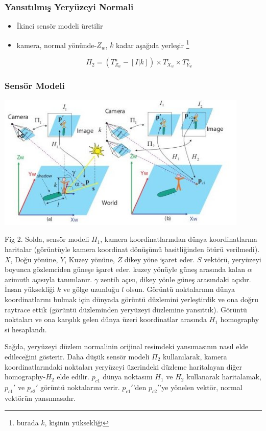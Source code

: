 \documentclass{beamer}
\begin{document}
\begin{frame}[allowframebreaks]
	\frametitle{Yansıtılmış Yeryüzeyi Normali}

	\begin{itemize}
		\item İkinci sensör modeli üretilir
		\item kamera, normal yönünde-$Z_w$, $k$ kadar aşağıda yerleşir
			\footnote{burada $k$, kişinin yüksekliği}

			\begin{equation}
				\Pi_2 = (T^a_{Z_w} - [I|k]) \times T^e_{X_w} \times T^n_{Y_w}
					\label{eq:ikinci-sensor-matrisi}
			\end{equation}
	\end{itemize}
\end{frame}

\begin{frame}[allowframebreaks]
	\frametitle{Sensör Modeli}

	\includegraphics[width=0.9\textwidth]{img/fig2.jpg}\label{fig:sensor-model}

	\begin{scriptsize}
		Fig 2.
		Solda, sensör modeli $\Pi_1$, kamera koordinatlarından dünya koordinatlarına
		haritalar (görüntüyle kamera koordinat dönüşümü basitliğinden ötürü
		verilmedi). $X$, Doğu yönüne, $Y$, Kuzey yönüne, $Z$ dikey yöne işaret eder.
		$S$ vektörü, yeryüzeyi boyunca gözlemciden güneşe işaret eder. kuzey yönüyle
		güneş arasında kalan $\alpha$ azimuth açısıyla tanımlanır. $\gamma$ zentih
		açısı, dikey yönle güneş arasındaki açıdır. İnsan yüksekliği $k$ ve gölge
		uzunluğu $l$ olsun. Görüntü noktalarının dünya koordinatlarını bulmak için
		dünyada görüntü düzlemini yerleştirdik ve ona doğru raytrace ettik (görüntü
		düzleminden yeryüzeyi düzlemine yansıttık). Görüntü noktaları ve ona
		karşılık gelen dünya üzeri koordinatlar arasında $H_1$ homography si
		hesaplandı.

		Sağda, yeryüzeyi düzlem normalinin orijinal resimdeki yansımasının nasıl
		elde edileceğini gösterir. Daha düşük sensör modeli $\Pi_2$ kullanılarak,
		kamera koordinatlarındaki noktaları yeryüzeyi üzerindeki düzleme haritalayan
		diğer homography-$H_2$ elde edilir. $p_{c1}$ dünya noktasını $H_1$ ve $H_2$
		kullanarak haritalamak, $p_{c1}'$ ve $p_{c2}'$ görüntü noktalarını verir.
		$p_{c1}'$'den $p_{c2}'$'ye yönelen vektör, normal vektörün yansımasıdır.
	\end{scriptsize}
\end{frame}
\end{document}
